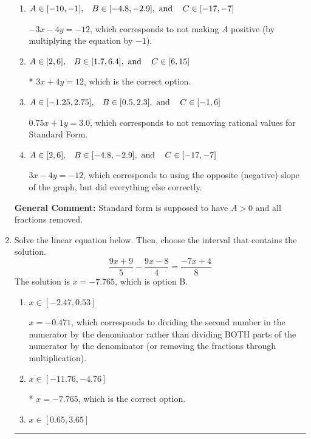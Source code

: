 \documentclass{extbook}[14pt]
\newcommand{\litem}[1]{\item #1

\rule{\textwidth}{0.4pt}}
\begin{document}
\begin{enumerate}
{\begin{enumerate}[label=\Alph*.]
 $0.75x - 1y = -3.0$, which corresponds to using the opposite (negative) slope of the graph and not removing rational values.
\item \( A \in [-10, -1], \hspace{3mm} B \in [-4.8, -2.9], \text{ and } \hspace{3mm} C \in [-17, -7] \)

 $-3x - 4y = -12$, which corresponds to not making $A$ positive (by multiplying the equation by $-1$).
\item \( A \in [2, 6], \hspace{3mm} B \in [1.7, 6.4], \text{ and } \hspace{3mm} C \in [6, 15] \)

* $3x + 4y = 12$, which is the correct option.
\item \( A \in [-1.25, 2.75], \hspace{3mm} B \in [0.5, 2.3], \text{ and } \hspace{3mm} C \in [-1, 6] \)

 $0.75x + 1y = 3.0$, which corresponds to not removing rational values for Standard Form.
\item \( A \in [2, 6], \hspace{3mm} B \in [-4.8, -2.9], \text{ and } \hspace{3mm} C \in [-17, -7] \)

 $3x - 4y = -12$, which corresponds to using the opposite (negative) slope of the graph, but did everything else correctly.
\end{enumerate}

\textbf{General Comment:} Standard form is supposed to have $A > 0$ and all fractions removed.
}
\litem{
Solve the linear equation below. Then, choose the interval that contains the solution.
\[ \frac{9x + 9}{5} - \frac{9x -8}{4} = \frac{-7x + 4}{8} \]The solution is \( x = -7.765 \), which is option B.\begin{enumerate}[label=\Alph*.]
\item \( x \in [-2.47, 0.53] \)

 $x = -0.471$, which corresponds to dividing the second number in the numerator by the denominator rather than dividing BOTH parts of the numerator by the denominator (or removing the fractions through multiplication).
\item \( x \in [-11.76, -4.76] \)

* $x = -7.765$, which is the correct option.
\item \( x \in [0.65, 3.65] \)


\end{enumerate}}
\end{enumerate}
\end{document}
